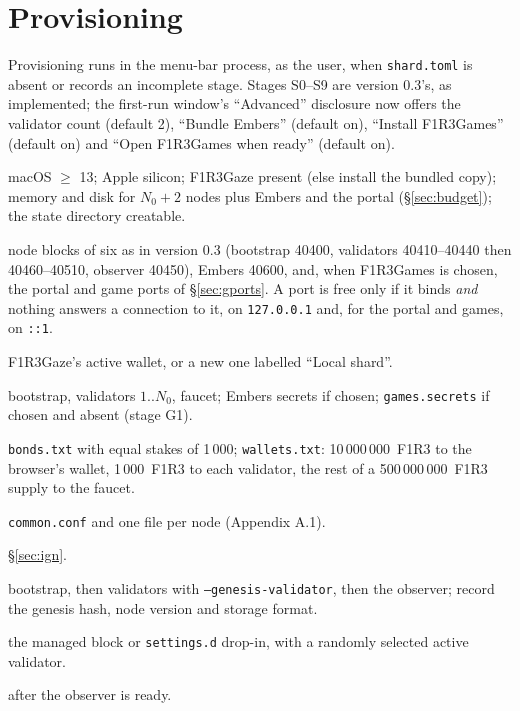 \documentclass[11pt]{article}
\theoremstyle{definition}
\theoremstyle{remark}
\newcommand{\code}[1]{\texttt{#1}}
\newcommand{\Gz}{F1R3Gaze}
\newcommand{\Gm}{F1R3Games}
\newcommand{\Em}{Embers}
\begin{document}
\section{Provisioning}\label{sec:prov}

Provisioning runs in the menu-bar process, as the user, when \code{shard.toml} is
absent or records an incomplete stage. Stages S0--S9 are version 0.3's, as
implemented; the first-run window's ``Advanced'' disclosure now offers the validator
count (default 2), ``Bundle \Em{}'' (default on), ``Install \Gm{}'' (default on) and
``Open \Gm{} when ready'' (default on).

\begin{description}[leftmargin=1.5em,style=nextline,itemsep=1pt]
\item[S0 preflight] macOS $\ge$ 13; Apple silicon; \Gz{} present (else install the
  bundled copy); memory and disk for $N_0+2$ nodes plus \Em{} and the portal
  (\S\ref{sec:budget}); the state directory creatable.
\item[S1 ports] node blocks of six as in version 0.3 (bootstrap 40400, validators
  40410--40440 then 40460--40510, observer 40450), \Em{} 40600, and, when \Gm{} is
  chosen, the portal and game ports of \S\ref{sec:gports}. A port is free only if it
  binds \emph{and} nothing answers a connection to it, on \code{127.0.0.1} and, for the
  portal and games, on \code{::1}.
\item[S2 the paying wallet] \Gz{}'s active wallet, or a new one labelled ``Local
  shard''.
\item[S3 keys] bootstrap, validators $1..N_0$, faucet; \Em{} secrets if chosen;
  \code{games.secrets} if chosen and absent (stage G1).
\item[S4 genesis files] \code{bonds.txt} with equal stakes of 1\,000;
  \code{wallets.txt}: 10\,000\,000~F1R3 to the browser's wallet, 1\,000~F1R3 to each
  validator, the rest of a 500\,000\,000~F1R3 supply to the faucet.
\item[S5 node configurations] \code{common.conf} and one file per node
  (Appendix A.1).
\item[S6 load the agent] \S\ref{sec:ign}.
\item[S7 genesis] bootstrap, then validators with \code{--genesis-validator}, then
  the observer; record the genesis hash, node version and storage format.
\item[S8 configure \Gz{}] the managed block or \code{settings.d} drop-in, with a
  randomly selected active validator.
\item[S9 open \Gz{}] after the observer is ready.
\end{description}
\end{document}
